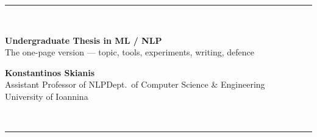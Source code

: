\documentclass[10pt,a4paper]{article}
\begin{document}
\fontsize{6.05}{7.15}\selectfont

{\color{brandlight}\rule{\textwidth}{2pt}}\\[2pt]
\begin{minipage}[b]{0.63\textwidth}
{\fontsize{17}{18}\selectfont\bfseries\color{brand} Undergraduate Thesis in ML / NLP}\\[2pt]
{\fontsize{8}{9}\selectfont\color{ink} The one-page version --- topic, tools, experiments, writing, defence}
\end{minipage}%
\hfill
\begin{minipage}[b]{0.36\textwidth}\raggedleft
{\fontsize{8}{9}\selectfont\bfseries\color{ink} Konstantinos Skianis}\\[1pt]
{\color{mutegray} Assistant Professor of NLP\dt Dept.\ of Computer Science \& Engineering\\
University of Ioannina\dt {}}
\end{minipage}\\[2pt]
{\color{brandlight}\rule{\textwidth}{2pt}}
\end{document}
